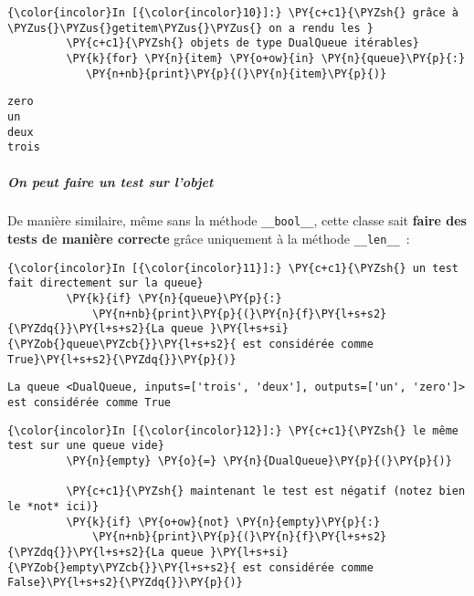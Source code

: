     \begin{Verbatim}[commandchars=\\\{\}]
{\color{incolor}In [{\color{incolor}10}]:} \PY{c+c1}{\PYZsh{} grâce à \PYZus{}\PYZus{}getitem\PYZus{}\PYZus{} on a rendu les }
         \PY{c+c1}{\PYZsh{} objets de type DualQueue itérables}
         \PY{k}{for} \PY{n}{item} \PY{o+ow}{in} \PY{n}{queue}\PY{p}{:}
            \PY{n+nb}{print}\PY{p}{(}\PY{n}{item}\PY{p}{)}
\end{Verbatim}


    \begin{Verbatim}[commandchars=\\\{\}]
zero
un
deux
trois

    \end{Verbatim}

    \hypertarget{on-peut-faire-un-test-sur-lobjet}{%
\subparagraph{On peut faire un test sur
l'objet}\label{on-peut-faire-un-test-sur-lobjet}}

    De manière similaire, même sans la méthode \texttt{\_\_bool\_\_}, cette
classe sait \textbf{faire des tests de manière correcte} grâce
uniquement à la méthode \texttt{\_\_len\_\_}~:

    \begin{Verbatim}[commandchars=\\\{\}]
{\color{incolor}In [{\color{incolor}11}]:} \PY{c+c1}{\PYZsh{} un test fait directement sur la queue}
         \PY{k}{if} \PY{n}{queue}\PY{p}{:}
             \PY{n+nb}{print}\PY{p}{(}\PY{n}{f}\PY{l+s+s2}{\PYZdq{}}\PY{l+s+s2}{La queue }\PY{l+s+si}{\PYZob{}queue\PYZcb{}}\PY{l+s+s2}{ est considérée comme True}\PY{l+s+s2}{\PYZdq{}}\PY{p}{)}
\end{Verbatim}


    \begin{Verbatim}[commandchars=\\\{\}]
La queue <DualQueue, inputs=['trois', 'deux'], outputs=['un', 'zero']> est considérée comme True

    \end{Verbatim}

    \begin{Verbatim}[commandchars=\\\{\}]
{\color{incolor}In [{\color{incolor}12}]:} \PY{c+c1}{\PYZsh{} le même test sur une queue vide}
         \PY{n}{empty} \PY{o}{=} \PY{n}{DualQueue}\PY{p}{(}\PY{p}{)}
         
         \PY{c+c1}{\PYZsh{} maintenant le test est négatif (notez bien le *not* ici)}
         \PY{k}{if} \PY{o+ow}{not} \PY{n}{empty}\PY{p}{:}
             \PY{n+nb}{print}\PY{p}{(}\PY{n}{f}\PY{l+s+s2}{\PYZdq{}}\PY{l+s+s2}{La queue }\PY{l+s+si}{\PYZob{}empty\PYZcb{}}\PY{l+s+s2}{ est considérée comme False}\PY{l+s+s2}{\PYZdq{}}\PY{p}{)}
\end{Verbatim}


